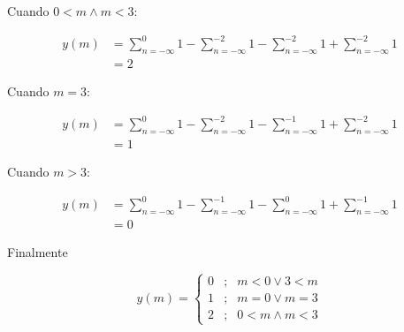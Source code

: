\documentclass[a4paper,12pt,final]{article}
\begin{document}
\begin{enumerate}[label=\alph*)]
          \noindent Cuando $0<m \wedge m<3$:

          \begin{equation*}
            \begin{split}
              y\left(m\right) & = \sum_{n=-\infty}^{0} 1 -
                                  \sum_{n=-\infty}^{-2} 1 -
                                  \sum_{n=-\infty}^{-2} 1 +
                                  \sum_{n=-\infty}^{-2} 1 \\
                              & = 2
            \end{split}
          \end{equation*}

          \noindent Cuando $m=3$:

          \begin{equation*}
            \begin{split}
              y\left(m\right) & = \sum_{n=-\infty}^{0} 1 -
                                  \sum_{n=-\infty}^{-2} 1 -
                                  \sum_{n=-\infty}^{-1} 1 +
                                  \sum_{n=-\infty}^{-2} 1 \\
                              & = 1
            \end{split}
          \end{equation*}

          \noindent Cuando $m>3$:

          \begin{equation*}
            \begin{split}
              y\left(m\right) & = \sum_{n=-\infty}^{0} 1 -
                                  \sum_{n=-\infty}^{-1} 1 -
                                  \sum_{n=-\infty}^{0} 1 +
                                  \sum_{n=-\infty}^{-1} 1 \\
                              & = 0
            \end{split}
          \end{equation*}

          \noindent Finalmente

          \begin{equation*}
            y\left(m\right) = \left\{
              \begin{array}{lcl}
                0 &;& m < 0  \vee  3 < m \\ [1em]
                1 &;& m = 0  \vee  m = 3 \\ [1em]
                2 &;& 0 < m \wedge m < 3
              \end{array}
            \right.
          \end{equation*}
          \vfill
          \newpage


\end{enumerate}
\end{document}
